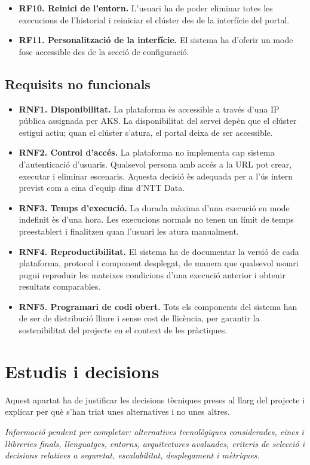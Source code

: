 \documentclass[11pt,a4paper]{article}
\newcommand{\requiredinfo}[1]{%
  \vspace{0.4em}%
  {\color{placeholdergray}\textit{Informaci\'o pendent per completar: #1.}}\par
}
\newcommand{\sectionintro}[1]{%
  \vspace{0.25em}%
  #1\par
}
\begin{document}
\begin{itemize}
  \item \textbf{RF10. Reinici de l'entorn.} L'usuari ha de poder eliminar totes les execucions de l'historial i reiniciar el cl\'uster des de la interf\'icie del portal.
  \item \textbf{RF11. Personalitzaci\'o de la interf\'icie.} El sistema ha d'oferir un mode fosc accessible des de la secci\'o de configuraci\'o.
\end{itemize}

\subsection{Requisits no funcionals}
\begin{itemize}
  \item \textbf{RNF1. Disponibilitat.} La plataforma \`es accessible a trav\'es d'una IP p\'ublica assignada per AKS. La disponibilitat del servei dep\`en que el cl\'uster estigui actiu; quan el cl\'uster s'atura, el portal deixa de ser accessible.
  \item \textbf{RNF2. Control d'acc\'es.} La plataforma no implementa cap sistema d'autenticaci\'o d'usuaris. Qualsevol persona amb acc\'es a la URL pot crear, executar i eliminar escenaris. Aquesta decisi\'o \`es adequada per a l'\'us intern previst com a eina d'equip dins d'NTT Data.
  \item \textbf{RNF3. Temps d'execuci\'o.} La durada m\`axima d'una execuci\'o en mode indefinit \`es d'una hora. Les execucions normals no tenen un l\'imit de temps preestablert i finalitzen quan l'usuari les atura manualment.
  \item \textbf{RNF4. Reproductibilitat.} El sistema ha de documentar la versi\'o de cada plataforma, protocol i component desplegat, de manera que qualsevol usuari pugui reproduir les mateixes condicions d'una execuci\'o anterior i obtenir resultats comparables.
  \item \textbf{RNF5. Programari de codi obert.} Tots els components del sistema han de ser de distribuci\'o lliure i sense cost de llic\`encia, per garantir la sostenibilitat del projecte en el context de les pr\`actiques.
\end{itemize}

\section{Estudis i decisions}
\sectionintro{Aquest apartat ha de justificar les decisions t\`ecniques preses al llarg del projecte i explicar per qu\`e s'han triat unes alternatives i no unes altres.}
\requiredinfo{alternatives tecnol\`ogiques considerades, eines i llibreries finals, llenguatges, entorns, arquitectures avaluades, criteris de selecci\'o i decisions relatives a seguretat, escalabilitat, desplegament i m\`etriques}
\end{document}
